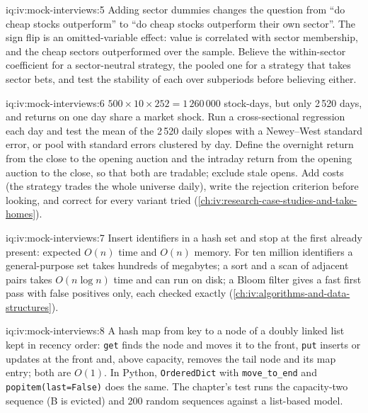 \begin{solution}{iq:iv:mock-interviews:5}
Adding sector dummies changes the question from ``do cheap stocks outperform'' to ``do cheap stocks outperform their own sector''.
The sign flip is an omitted-variable effect: value is correlated with sector membership, and the cheap sectors outperformed over the
sample. Believe the within-sector coefficient for a sector-neutral strategy, the pooled one for a strategy that takes sector bets,
and test the stability of each over subperiods before believing either.
\end{solution}

\begin{solution}{iq:iv:mock-interviews:6}
$500 \times 10 \times 252 = 1\,260\,000$ stock-days, but only 2\,520 days, and returns on one day share a market shock. Run a
cross-sectional regression each day and test the mean of the 2\,520 daily slopes with a Newey--West standard error, or pool with
standard errors clustered by day. Define the overnight return from the close to the opening auction and the intraday return from the
opening auction to the close, so that both are tradable; exclude stale opens. Add costs (the strategy trades the whole universe
daily), write the rejection criterion before looking, and correct for every variant tried (\cref{ch:iv:research-case-studies-and-take-homes}).
\end{solution}

\begin{solution}{iq:iv:mock-interviews:7}
Insert identifiers in a hash set and stop at the first already present: expected $O(n)$ time and $O(n)$ memory. For ten million
identifiers a general-purpose set takes hundreds of megabytes; a sort and a scan of adjacent pairs takes $O(n \log n)$ time and can
run on disk; a Bloom filter gives a fast first pass with false positives only, each checked exactly
(\cref{ch:iv:algorithms-and-data-structures}).
\end{solution}

\begin{solution}{iq:iv:mock-interviews:8}
A hash map from key to a node of a doubly linked list kept in recency order: \texttt{get} finds the node and moves it to the front,
\texttt{put} inserts or updates at the front and, above capacity, removes the tail node and its map entry; both are $O(1)$. In
Python, \texttt{OrderedDict} with \texttt{move\_to\_end} and \texttt{popitem(last=False)} does the same. The chapter's test runs the
capacity-two sequence (B is evicted) and 200 random sequences against a list-based model.
\end{solution}

